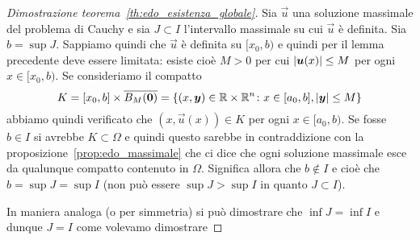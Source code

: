 \begin{proof}[Dimostrazione teorema~\ref{th:edo_esistenza_globale}]
Sia $\vec u$ una soluzione massimale del problema di Cauchy e sia
$J\subset I$ l'intervallo massimale su cui $\vec u$ è definita.
Sia $b=\sup J$. Sappiamo quindi che $\vec u$ è definita su $[x_0,b)$
e quindi per il lemma precedente deve essere limitata: esiste cioè
$M>0$ per cui ${\left|\boldsymbol u(x)\right|}\le M$ per ogni $x\in[x_0,b)$.
Se consideriamo il compatto
\[
K=[x_0,b] \times \overline{B_M(\boldsymbol 0)}
 = {\left\{ (x,\boldsymbol y)\in {\mathbb R} \times {\mathbb R}^n\colon x\in [a_0,b], {\left|\boldsymbol y\right|}\le M \right\}}
\]
abbiamo quindi verificato che $(x,\vec u(x))\in K$ per ogni $x\in [a_0,b)$.
Se fosse $b\in I$ si avrebbe $K\subset \Omega$ e quindi questo sarebbe
in contraddizione con la proposizione~\ref{prop:edo_massimale} che
ci dice che ogni soluzione massimale esce da qualunque compatto contenuto
in $\Omega$. Significa allora che $b\not \in I$ e cioè che $b = \sup J = \sup I$
(non può essere $\sup J>\sup I$ in quanto $J\subset I$).

In maniera analoga (o per simmetria) si può dimostrare che $\inf J=\inf I$
e dunque $J=I$ come volevamo dimostrare
\end{proof}

